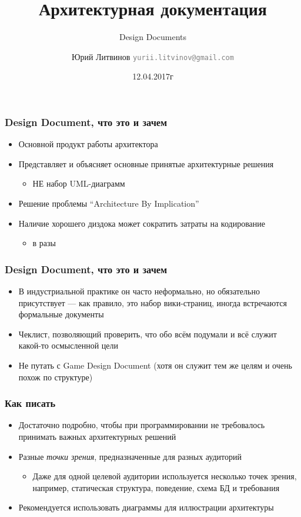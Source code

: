 \documentclass[xetex,mathserif,serif]{beamer}
\title{Архитектурная документация}
\subtitle{Design Documents}
\author[Юрий Литвинов]{Юрий Литвинов \newline \textcolor{gray}{\small\texttt{yurii.litvinov@gmail.com}}}
\date{12.04.2017г}
\begin{document}
	
	\frame{\titlepage}

	\begin{frame}
		\frametitle{Design Document, что это и зачем}
		\begin{itemize}
			\item Основной продукт работы архитектора
			\item Представляет и объясняет основные принятые архитектурные решения
			\begin{itemize}
				\item НЕ набор UML-диаграмм
			\end{itemize}
			\item Решение проблемы ``Architecture By Implication''
			\item Наличие хорошего диздока может сократить затраты на кодирование 
			\begin{itemize}
				\item в разы
			\end{itemize}
		\end{itemize}
	\end{frame}

	\begin{frame}
		\frametitle{Design Document, что это и зачем}
		\begin{itemize}
			\item В индустриальной практике он часто неформально, но обязательно присутствует --- как правило, это набор вики-страниц, иногда встречаются формальные документы
			\item Чеклист, позволяющий проверить, что обо всём подумали и всё служит какой-то осмысленной цели
			\item Не путать с Game Design Document (хотя он служит тем же целям и очень похож по структуре)
		\end{itemize}
	\end{frame}

	\begin{frame}
		\frametitle{Как писать}
		\begin{itemize}
			\item Достаточно подробно, чтобы при программировании не требовалось принимать важных архитектурных решений
			\item Разные \textit{точки зрения}, предназначенные для разных аудиторий
			\begin{itemize}
				\item Даже для одной целевой аудитории используется несколько точек зрения, например, статическая структура, поведение, схема БД и требования
			\end{itemize}
			\item Рекомендуется использовать диаграммы для иллюстрации архитектуры
		\end{itemize}
	\end{frame}
\end{document}
